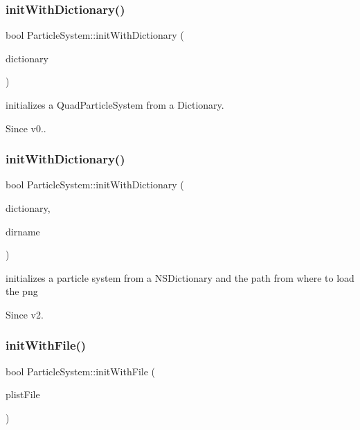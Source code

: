 \subsubsection{\texorpdfstring{init\+With\+Dictionary()}{initWithDictionary()}\hspace{0.1cm}{\footnotesize\ttfamily [3/4]}}
{\footnotesize\ttfamily bool Particle\+System\+::init\+With\+Dictionary (\begin{DoxyParamCaption}\item[{Value\+Map \&}]{dictionary }\end{DoxyParamCaption})}

initializes a Quad\+Particle\+System from a Dictionary. \begin{DoxySince}{Since}
v0.. 
\end{DoxySince}
\mbox{\label{classParticleSystem_af9ea32fce54ca0962029e64e9558aded}} 
\subsubsection{\texorpdfstring{init\+With\+Dictionary()}{initWithDictionary()}\hspace{0.1cm}{\footnotesize\ttfamily [4/4]}}
{\footnotesize\ttfamily bool Particle\+System\+::init\+With\+Dictionary (\begin{DoxyParamCaption}\item[{Value\+Map \&}]{dictionary,  }\item[{const std\+::string \&}]{dirname }\end{DoxyParamCaption})}

initializes a particle system from a N\+S\+Dictionary and the path from where to load the png \begin{DoxySince}{Since}
v2. 
\end{DoxySince}
\mbox{\label{classParticleSystem_ae7ac29438534c33f71f36502b75a2c62}} 
\subsubsection{\texorpdfstring{init\+With\+File()}{initWithFile()}\hspace{0.1cm}{\footnotesize\ttfamily [1/2]}}
{\footnotesize\ttfamily bool Particle\+System\+::init\+With\+File (\begin{DoxyParamCaption}\item[{const std\+::string \&}]{plist\+File }\end{DoxyParamCaption})}

